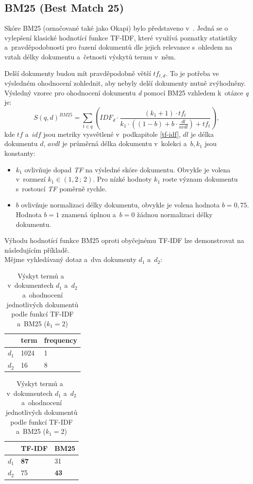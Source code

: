 \subsection{BM25 (Best Match 25)}
\label{bm25}
Skóre BM25 (označované také jako Okapi) bylo představeno v~\cite{bm25}. Jedná se o vylepšení klasické hodnotící funkce TF-IDF, které využívá poznatky statistiky a~pravděpodobnosti pro řazení dokumentů dle jejich relevance s~ohledem na vztah délky dokumentu a~četnosti výskytů termu v~něm.\par
Delší dokumenty budou mít pravděpodobně větší $tf_{t,d}$. To je potřeba ve výsledném ohodnocení zohlednit, aby nebyly delší dokumenty nutně zvýhodněny.
Výsledný vzorec pro ohodnocení dokumentu \emph{d} pomocí BM25 vzhledem k~otázce \emph{q} je:
\begin{equation}
    S(q,d)^{BM25} = \sum_{t \in q} \left(IDF_d \cdot \frac{(k_1+1)\cdot tf_t}{k_1\cdot ((1-b)+b \cdot \frac{dl}{avdl}) + tf_t}\right),
\end{equation}
kde $tf$ a~$idf$ jsou metriky vysvětlené v~podkapitole \ref{tf-idf}, $dl$ je délka dokumentu $d$, $avdl$ je průměrná délka dokumentu v~kolekci a~$b,k_1$ jsou konstanty:
\begin{itemize}
    \item $k_1$ ovlivňuje dopad \emph{TF} na výsledné skóre dokumentu. Obvykle je volena v~rozmezí $k_1\in(1,2\,;\,2)$. Pro nízké hodnoty $k_1$ roste význam dokumentu s~rostoucí \emph{TF} poměrně rychle.
    \item $b$ ovlivňuje normalizaci délky dokumentu, obvykle je volena hodnota $b=0,75$. Hodnota $b=1$ znamená úplnou a~$b=0$ žádnou normalizaci délky dokumentu.
\end{itemize}

Výhodu hodnotící funkce BM25 oproti obyčejnému TF-IDF lze demonstrovat na následujícím příkladě.\\ \medskip
Mějme vyhledávaný dotaz  a~dva dokumenty $d_1$ a~$d_2$:\par

\begin{table}[H]
\centering
\begin{tabular}{|c|l|l|}
\hline
      & term & frequency \\ \hline
$d_1$ & 1024 & 1         \\ \hline
$d_2$ & 16   & 8         \\ \hline
\end{tabular}
\begin{tabular}{|c|l|l|}
\hline
      & \textbf{TF-IDF} & \textbf{BM25} \\ \hline
$d_1$ & \textbf{87} & 31         \\ \hline
$d_2$ & 75 & \textbf{43}         \\ \hline
\end{tabular}
\caption{Výskyt termů  a~ v~dokumentech $d_1$ a~$d_2$ a~ohodnocení jednotlivých dokumentů podle funkcí TF-IDF a~BM25 ($k_1 = 2$)}
\label{tab:tf}
\end{table}

